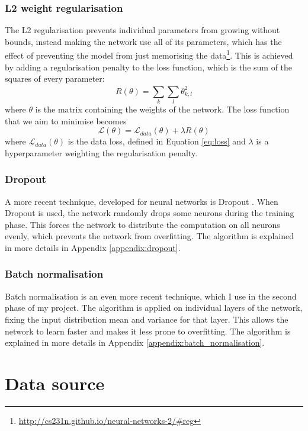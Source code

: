 \documentclass[12pt,a4paper,twoside,openright]{report}
\begin{document}
\subsubsection{\textbf{L2} weight regularisation}
The L2 regularisation prevents individual parameters from growing without bounds, instead making the network use all of its parameters, which has the effect of preventing the model from just memorising the data\footnote{\url{http://cs231n.github.io/neural-networks-2/\#reg}}. This is achieved by adding a regularisation penalty to the loss function, which is the sum of the squares of every parameter:
\begin{equation}
	R(\theta) = \sum_{k}^{} \sum_{l}^{} \theta_{k,l}^2
\end{equation} 
where $\theta$ is the matrix containing the weights of the network.
The loss function that we aim to minimise becomes
\begin{equation}
	\mathcal{L}(\theta) = \mathcal{L}_{data}(\theta) + \lambda R(\theta) 
\end{equation}
where $\mathcal{L}_{data}(\theta)$ is the data loss, defined in Equation \ref{eq:loss} and $\lambda$ is a hyperparameter weighting the regularisation penalty. 

\subsubsection{Dropout}
A more recent technique, developed for neural networks is Dropout \cite{dropout}. When Dropout is used, the network randomly drops some neurons during the training phase. This forces the network to distribute the computation on all neurons evenly, which prevents the network from overfitting. The algorithm is explained in more details in Appendix \ref{appendix:dropout}.

\subsubsection{Batch normalisation}
Batch normalisation \cite{batch_normalization} is an even more recent technique, which I use in the second phase of my project. The algorithm is applied on individual layers of the network, fixing the input distribution mean and variance for that layer. This allows the network to learn faster and makes it less prone to overfitting. The algorithm is explained in more details in Appendix \ref{appendix:batch_normalisation}.

\section{Data source}
\end{document}
